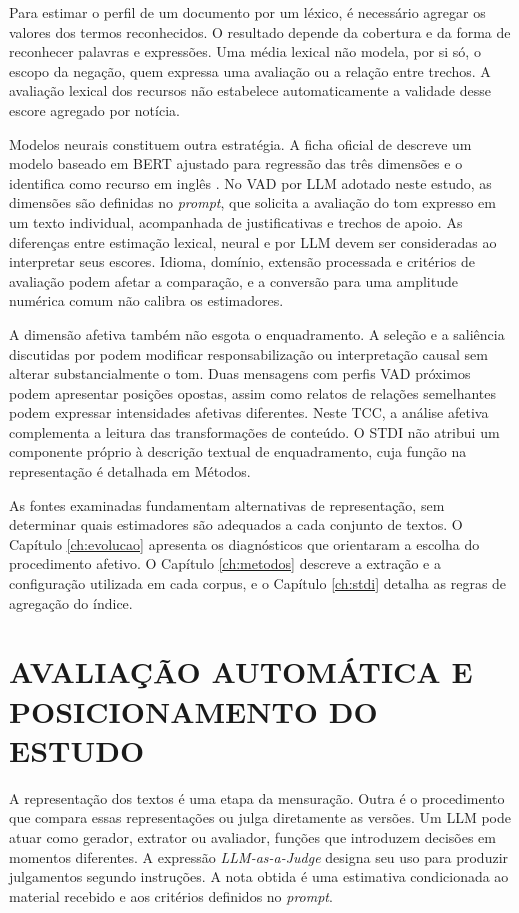 Para estimar o perfil de um documento por um léxico, é necessário agregar os valores dos termos reconhecidos. O resultado depende da cobertura e da forma de reconhecer palavras e expressões. Uma média lexical não modela, por si só, o escopo da negação, quem expressa uma avaliação ou a relação entre trechos. A avaliação lexical dos recursos não estabelece automaticamente a validade desse escore agregado por notícia.

Modelos neurais constituem outra estratégia. A ficha oficial de  descreve um modelo baseado em BERT ajustado para regressão das três dimensões e o identifica como recurso em inglês \cite{robrokoolsvadbert}. No VAD por LLM adotado neste estudo, as dimensões são definidas no \textit{prompt}, que solicita a avaliação do tom expresso em um texto individual, acompanhada de justificativas e trechos de apoio. As diferenças entre estimação lexical, neural e por LLM devem ser consideradas ao interpretar seus escores. Idioma, domínio, extensão processada e critérios de avaliação podem afetar a comparação, e a conversão para uma amplitude numérica comum não calibra os estimadores.

A dimensão afetiva também não esgota o enquadramento. A seleção e a saliência discutidas por  podem modificar responsabilização ou interpretação causal sem alterar substancialmente o tom. Duas mensagens com perfis VAD próximos podem apresentar posições opostas, assim como relatos de relações semelhantes podem expressar intensidades afetivas diferentes. Neste TCC, a análise afetiva complementa a leitura das transformações de conteúdo. O STDI não atribui um componente próprio à descrição textual de enquadramento, cuja função na representação é detalhada em Métodos.

As fontes examinadas fundamentam alternativas de representação, sem determinar quais estimadores são adequados a cada conjunto de textos. O Capítulo \ref{ch:evolucao} apresenta os diagnósticos que orientaram a escolha do procedimento afetivo. O Capítulo \ref{ch:metodos} descreve a extração e a configuração utilizada em cada corpus, e o Capítulo \ref{ch:stdi} detalha as regras de agregação do índice.

\section{AVALIAÇÃO AUTOMÁTICA E POSICIONAMENTO DO ESTUDO}
\label{sec:avaliacao-llm}

A representação dos textos é uma etapa da mensuração. Outra é o procedimento que compara essas representações ou julga diretamente as versões. Um LLM pode atuar como gerador, extrator ou avaliador, funções que introduzem decisões em momentos diferentes. A expressão \textit{LLM-as-a-Judge} designa seu uso para produzir julgamentos segundo instruções. A nota obtida é uma estimativa condicionada ao material recebido e aos critérios definidos no \textit{prompt}.

